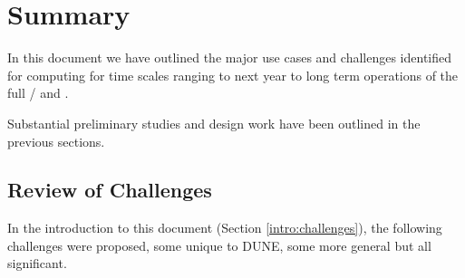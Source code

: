 \documentclass[../main-v1.tex]{subfiles}
\begin{document}
\chapter{Summary}
\label{ch:conclusions}

In this document we have outlined the major use cases and challenges identified for  computing for time scales ranging to next year  to long term operations of the full /   and . 

Substantial preliminary studies and design work have been outlined in the previous sections. 

\section{Review of Challenges}
 

In the introduction to this document (Section \ref{intro:challenges}),  the following challenges were proposed, some unique to DUNE, some more general but all significant. 


\end{document}
